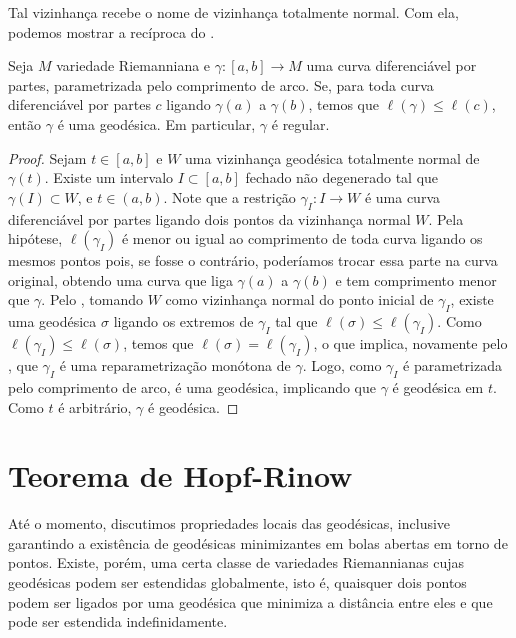 Tal vizinhança recebe o nome de vizinhança totalmente normal. Com ela, podemos mostrar a recíproca do .
\begin{theorem}
    \label{teo:menor-distancia-geodesica}
    Seja $M$ variedade Riemanniana e $\gamma:[a,b]\to M$ uma curva diferenciável por partes, parametrizada pelo comprimento de arco. Se, para toda curva diferenciável por partes $c$ ligando $\gamma(a)$ a $\gamma(b)$, temos que $\ell(\gamma)\leq \ell(c)$, então $\gamma$ é uma geodésica. Em particular, $\gamma$ é regular.
    \begin{proof}

        Sejam $t \in [a,b]$ e $W$ uma vizinhança geodésica totalmente normal de $\gamma(t)$. Existe um intervalo $I \subset [a,b]$ fechado não degenerado tal que $\gamma(I) \subset W$, e $t \in (a,b)$. Note que a restrição $\gamma_I: I \to W$ é uma curva diferenciável por partes ligando dois pontos da vizinhança normal $W$. Pela hipótese, $\ell(\gamma_I)$ é menor ou igual ao comprimento de toda curva ligando os mesmos pontos pois, se fosse o contrário, poderíamos trocar essa parte na curva original, obtendo uma curva que liga $\gamma(a)$ a $\gamma(b)$ e tem comprimento menor que $\gamma$.
        Pelo , tomando $W$ como vizinhança normal do ponto inicial de $\gamma_I$, existe uma geodésica $\sigma$ ligando os extremos de $\gamma_I$ tal que $\ell(\sigma) \le \ell(\gamma_I)$. Como $\ell(\gamma_I) \le \ell(\sigma)$, temos que  $\ell(\sigma) = \ell(\gamma_I)$, o que implica, novamente pelo , que $\gamma_{I}$ é uma reparametrização monótona de $\gamma$. Logo, como $\gamma_{I}$ é parametrizada pelo comprimento de arco, é uma geodésica, implicando que $\gamma$ é geodésica em $t$. Como $t$ é arbitrário, $\gamma$ é geodésica.
    \end{proof}
\end{theorem}
\section{Teorema de Hopf-Rinow}
\label{sec:teorema-hopf-rinow}
Até o momento, discutimos propriedades locais das geodésicas, inclusive garantindo a existência de geodésicas minimizantes em bolas abertas em torno de pontos. Existe, porém, uma certa classe de variedades Riemannianas cujas geodésicas podem ser estendidas globalmente, isto é, quaisquer dois pontos podem ser ligados por uma geodésica que minimiza a distância entre eles e que pode ser estendida indefinidamente.

